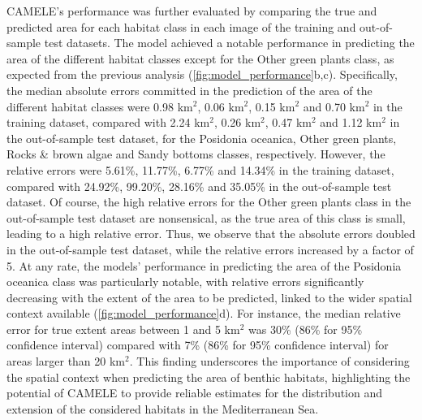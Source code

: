 CAMELE's performance was further evaluated by comparing the true and predicted
area for each habitat class in each image of the training and out-of-sample
test datasets. The model achieved a notable performance in predicting the area
of the different habitat classes except for the Other green plants class,
as expected from the previous analysis (\cref{fig:model_performance}b,c).
Specifically, the median absolute errors committed in the prediction of the
area of the different habitat classes were 0.98 km$^2$, 0.06 km$^2$, 0.15
km$^2$ and 0.70 km$^2$ in the training dataset, compared with 2.24 km$^2$, 0.26
km$^2$, 0.47 km$^2$ and 1.12 km$^2$ in the out-of-sample test dataset, for the
Posidonia oceanica, Other green plants, Rocks \& brown algae
and Sandy bottoms classes, respectively. However, the relative errors
were 5.61\%, 11.77\%, 6.77\% and 14.34\% in the training dataset, compared with
24.92\%, 99.20\%, 28.16\% and 35.05\% in the out-of-sample test dataset. Of
course, the high relative errors for the Other green plants
class in the out-of-sample test dataset are nonsensical, as the true area of
this class is small, leading to a high relative error. Thus, we observe
that the absolute errors doubled in the out-of-sample test dataset, while the
relative errors increased by a factor of 5. At any rate, the models'
performance in predicting the area of the Posidonia oceanica class was
particularly notable, with relative errors significantly decreasing with
the extent of the area to be predicted, linked to the wider spatial context
available (\cref{fig:model_performance}d). For instance, the median relative
error for true extent areas between 1 and 5 km$^2$ was 30\% (86\% for 95\%
confidence interval) compared with 7\% (86\% for 95\% confidence interval) for
areas larger than 20 km$^2$.  This finding underscores the importance of
considering the spatial context when predicting the area of benthic habitats,
highlighting the potential of CAMELE to provide reliable estimates for the
distribution and extension of the considered habitats in the Mediterranean Sea.

